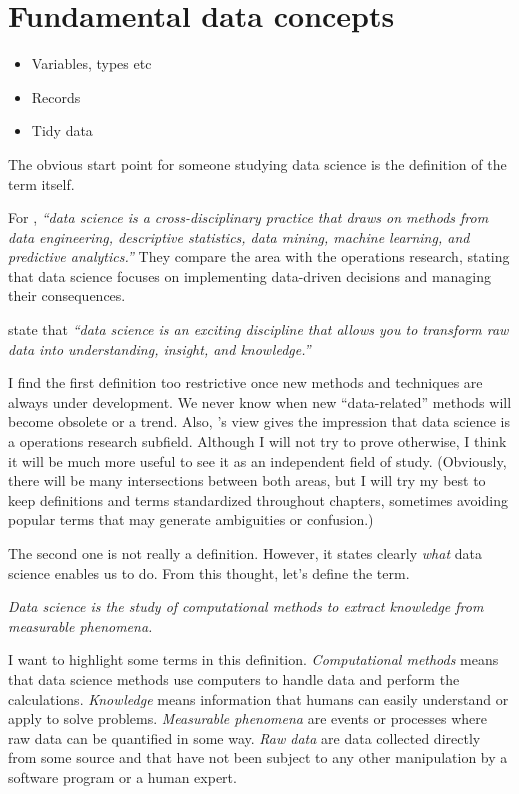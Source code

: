 \chapter{Fundamental data concepts}

\begin{itemize}
  \item Variables, types etc
  \item Records
  \item Tidy data
\end{itemize}

The obvious start point for someone studying data science is the definition of the term
itself.

For \textcite{Zumel2019}, \emph{``data science is a cross-disciplinary practice that draws
on methods from data engineering, descriptive statistics, data mining, machine learning,
and predictive analytics.''}  They compare the area with the operations research, stating
that data science focuses on implementing data-driven decisions and managing their
consequences.

\textcite{Hickham2023} state that \emph{``data science is an exciting discipline that
allows you to transform raw data into understanding, insight, and knowledge.''}

I find the first definition too restrictive once new methods and techniques are always
under development.  We never know when new ``data-related'' methods will become obsolete
or a trend.  Also, \textcite{Zumel2019}'s view gives the impression that data science is a
operations research subfield.  Although I will not try to prove otherwise, I think it will
be much more useful to see it as an independent field of study.  (Obviously, there will be
many intersections between both areas, but I will try my best to keep definitions and
terms standardized throughout chapters, sometimes avoiding popular terms that may generate
ambiguities or confusion.)

The second one is not really a definition.  However, it states clearly \emph{what} data
science enables us to do.  From this thought, let's define the term.

\begin{displayquote}
  \em
  Data science is the study of computational methods to extract knowledge from
  measurable phenomena.
\end{displayquote}

I want to highlight some terms in this definition.  \emph{Computational methods} means
that data science methods use computers to handle data and perform the calculations.
\emph{Knowledge} means information that humans can easily understand or apply to solve
problems.  \emph{Measurable phenomena} are events or processes where raw data can be
quantified in some way.  \emph{Raw data} are data collected directly from some source and
that have not been subject to any other manipulation by a software program or a human
expert.
